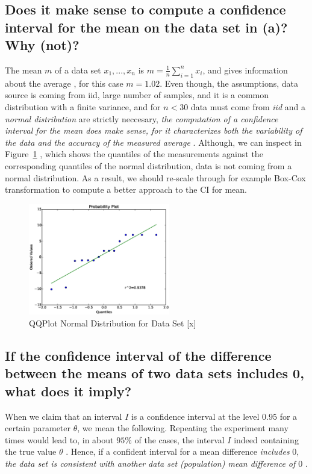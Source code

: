 \documentclass [12 pt , a4paper ] {article}
\begin{document}
\subsection{Does it make sense to compute a confidence interval for the mean on the data set in (a)? Why (not)?}
\par The mean $m$ of a data set $x_1,...,x_n$
is $m = \frac{1}{n} \sum\limits_{i=1}^{n} x_i $, and gives
information about the average \cite{leboudec}, for
this case $m=1.02$. Even though, the assumptions, data source is coming from iid, large number
of samples, and it is a common distribution with a finite
variance, and for $n<30$ data must come from \emph{iid} and a \emph{normal distribution}
are strictly neccesary, \emph{the computation of a confidence interval
for the mean does make sense, for it characterizes both the variability
of the data and the accuracy of the measured average} \cite{leboudec}. Although,
we can inspect in Figure~\ref{fig:qqplot} , which shows  the quantiles of the
measurements against the corresponding
quantiles of the normal distribution,
 data is not coming from a normal distribution. As a result,
 we should re-scale through for example Box-Cox transformation
 to compute a better approach to the CI for mean\cite{leboudec}.
\begin{figure}[!ht]
  \centering
  \includegraphics[scale=0.2,width=0.55\textwidth, natwidth=7000,natheight=1000]{qqplot.eps}
  \caption{QQPlot Normal Distribution for Data Set [x]}
  \label{fig:qqplot}
\end{figure}

 \subsection{If the confidence interval of the difference between the means of two data
 sets includes 0, what does it imply? }
 \par When we claim that an interval $I$ is a confidence interval
 at the level $0.95$ for a certain parameter $\theta$, we mean the following.
 Repeating the experiment many times would lead to,
 in about $95\%$ of the cases, the interval $I$ indeed containing
 the true value $\theta$ \cite{leboudec}. Hence, if a confident interval for a mean
 difference \emph{includes} $0$, \emph{the data set is consistent with another
  data set (population) mean difference of $0$} \cite{jerry}.
\end{document}

